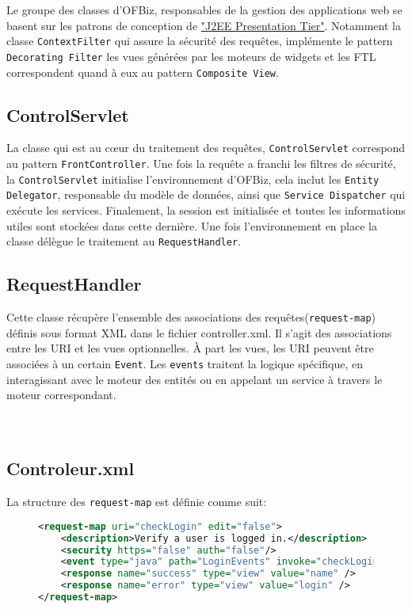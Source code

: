 Le groupe des classes d'OFBiz, responsables de la gestion des applications web se basent sur les patrons de conception de   \href{http://www2.sys-con.com/itsg/virtualcd/java/archives/0701/malks/index.html}{"J2EE Presentation Tier"}. Notamment la classe \verb|ContextFilter| qui assure la sécurité des requêtes, implémente le pattern \verb|Decorating Filter|  les vues générées par les moteurs de widgets et les FTL correspondent quand à eux au pattern \verb|Composite View|.
\subsection{ControlServlet}
La classe qui est au cœur du traitement des requêtes, \verb|ControlServlet| correspond au pattern \verb|FrontController|.
Une fois la requête a franchi les filtres de sécurité, la \verb|ControlServlet| initialise l'environnement d'OFBiz, cela inclut les \verb|Entity Delegator|, responsable du modèle de données, ainsi que  \verb|Service Dispatcher| qui exécute les services. Finalement, la session est initialisée et toutes les informations utiles sont stockées dans cette dernière. Une fois l'environnement en place la classe délègue le traitement au \verb|RequestHandler|.

\subsection{RequestHandler}
Cette classe récupère l'ensemble des associations des requêtes(\verb|request-map|) définis sous format XML dans le fichier controller.xml. Il s'agit des associations entre les URI et les vues optionnelles. À part les vues, les URI peuvent être associées à un certain \verb|Event|. Les \verb|events| traitent la logique spécifique, en interagissant avec le moteur des entités ou en appelant un service à travers le moteur correspondant. 
\\
\\
\\
\subsection{Controleur.xml}
La structure des \verb|request-map| est définie comme suit:
\begin{figure}[h!]
	\begin{lstlisting}[language=XML,frame=leftline]
<request-map uri="checkLogin" edit="false">
    <description>Verify a user is logged in.</description>
    <security https="false" auth="false"/>
    <event type="java" path="LoginEvents" invoke="checkLogin"/>
    <response name="success" type="view" value="name" />
    <response name="error" type="view" value="login" />
</request-map>
	\end{lstlisting}
\end{figure}\\
\\
